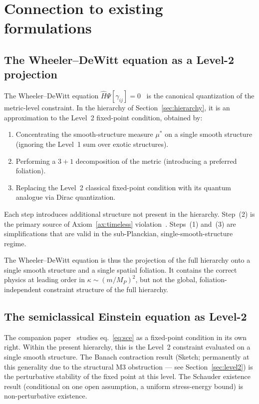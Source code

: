 \documentclass[12pt,a4paper]{article}
\theoremstyle{definition}
\theoremstyle{remark}
\begin{document}
\section{Connection to existing formulations}
\label{sec:connections}

\subsection{The Wheeler--DeWitt equation as a Level-2 projection}

The Wheeler--DeWitt equation $\hat{H}\Psi[\gamma_{ij}] =
0$~\cite{dewitt} is the canonical quantization of the metric-level
constraint. In the hierarchy of Section~\ref{sec:hierarchy}, it is an
approximation to the Level~2 fixed-point condition, obtained by:

\begin{enumerate}
\item Concentrating the smooth-structure measure $\mu^*$ on a single
smooth structure (ignoring the Level~1 sum over exotic structures).
\item Performing a $3+1$ decomposition of the metric (introducing a
preferred foliation).
\item Replacing the Level~2 classical fixed-point condition with its
quantum analogue via Dirac quantization.
\end{enumerate}

Each step introduces additional structure not present in the hierarchy.
Step~(2) is the primary source of Axiom~\ref{ax:timeless}
violation~\cite{kuchar}. Steps~(1) and~(3) are simplifications that are
valid in the sub-Planckian, single-smooth-structure regime.

The Wheeler--DeWitt equation is thus the projection of the full hierarchy
onto a single smooth structure and a single spatial foliation. It
contains the correct physics at leading order in $\kappa \sim (m/M_P)^2$,
but not the global, foliation-independent constraint structure of the
full hierarchy.

\subsection{The semiclassical Einstein equation as Level-2}

The companion paper~\cite{fixed_point} studies eq.~\eqref{eq:sce} as a
fixed-point condition in its own right. Within the present hierarchy,
this is the Level~2 constraint evaluated on a single smooth structure.
The Banach contraction result (Sketch; permanently at this generality due to
the structural M3 obstruction --- see Section~\ref{sec:level2}) is the
perturbative stability of the fixed point at this
level. The Schauder existence result (conditional on one open assumption,
a uniform stress-energy bound)
is non-perturbative existence.
\end{document}
